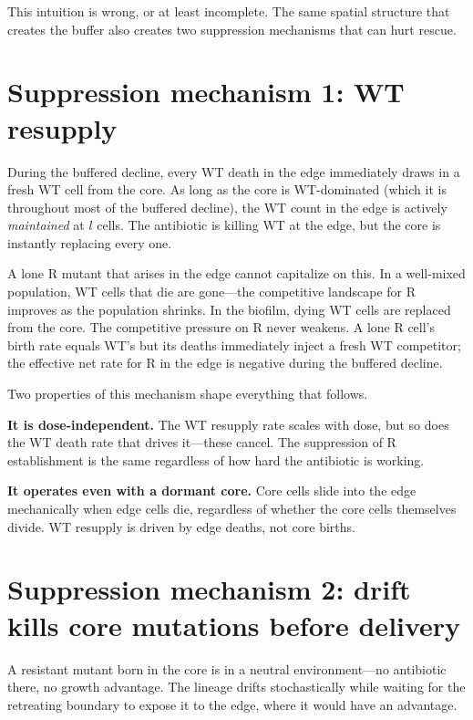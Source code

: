 \documentclass[12pt]{article}
\begin{document}
This intuition is wrong, or at least incomplete. The same spatial structure
that creates the buffer also creates two suppression mechanisms that can
hurt rescue.

\section{Suppression mechanism 1: WT resupply}

During the buffered decline, every WT death in the edge immediately draws in
a fresh WT cell from the core. As long as the core is WT-dominated (which it
is throughout most of the buffered decline), the WT count in the edge is
actively \emph{maintained} at $l$ cells. The antibiotic is killing WT at the
edge, but the core is instantly replacing every one.

A lone R mutant that arises in the edge cannot capitalize on this. In a
well-mixed population, WT cells that die are gone---the competitive
landscape for R improves as the population shrinks. In the biofilm, dying
WT cells are replaced from the core. The competitive pressure on R never
weakens. A lone R cell's birth rate equals WT's but its deaths immediately
inject a fresh WT competitor; the effective net rate for R in the edge is
negative during the buffered decline.

Two properties of this mechanism shape everything that follows.

\textbf{It is dose-independent.} The WT resupply rate scales with dose, but
so does the WT death rate that drives it---these cancel. The suppression of
R establishment is the same regardless of how hard the antibiotic is
working.

\textbf{It operates even with a dormant core.} Core cells slide into the
edge mechanically when edge cells die, regardless of whether the core cells
themselves divide. WT resupply is driven by edge deaths, not core births.

\section{Suppression mechanism 2: drift kills core mutations before delivery}

A resistant mutant born in the core is in a neutral environment---no
antibiotic there, no growth advantage. The lineage drifts stochastically
while waiting for the retreating boundary to expose it to the edge, where
it would have an advantage.
\end{document}
